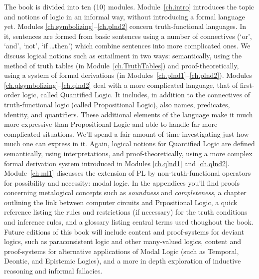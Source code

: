 The book is divided into ten (10) modules. Module~\ref{ch.intro} introduces the topic and notions of logic in an informal way, without introducing a formal language yet.  Modules \ref{ch.symbolizing}--\ref{ch.plnd2} concern truth-functional languages. In it, sentences are formed from basic sentences using a number of connectives (`or', `and', `not', `if \dots then') which combine sentences into more complicated ones.  We discuss logical notions such as entailment in two ways: semantically, using the method of truth tables (in Module~\ref{ch.TruthTables}) and proof-theoretically, using a system of formal derivations (in Modules~\ref{ch.plnd1}--\ref{ch.plnd2}).  Modules \ref{ch.qlsymbolizing}--\ref{ch.qlnd2} deal with a more complicated language, that of first-order logic, called Quantified Logic. It includes, in addition to the connectives of truth-functional logic (called Propositional Logic), also names, predicates, identity, and quantifiers. These additional elements of the language make it much more expressive than Propositional Logic and able to handle far more complicated situations. We'll spend a fair amount of time investigating just how much one can express in it.  Again, logical notions for Quantified Logic are defined semantically, using interpretations, and proof-theoretically, using a more complex formal derivation system introduced in Modules \ref{ch.qlnd1} and \ref{ch.qlnd2}.  Module~\ref{ch.ml1} discusses the extension of PL by non-truth-functional operators for possibility and necessity: modal logic. In the appendices you'll find proofs concerning metalogical concepts such as \emph{soundness} and \emph{completeness}, a chapter outlining the link between computer circuits and Prpositional Logic, a quick reference listing the rules and restrictions (if necessary) for the truth conditions and inference rules, and a glossary listing central terms used thoughout the book. Future editions of this book will include content and proof-systems for deviant logics, such as paraconsistent logic and other many-valued logics, content and proof-systems for alternative applications of Modal Logic (such as Temporal, Deontic, and Epistemic Logics), and a more in depth exploration of inductive reasoning and informal fallacies. 

